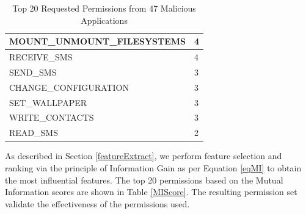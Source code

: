 \begin{table}[]
\begin{tabular}{|l|l|}
MOUNT\_UNMOUNT\_FILESYSTEMS       & 4                  \\ \hline
RECEIVE\_SMS                      & 4                  \\ \hline
SEND\_SMS                         & 3                  \\ \hline
CHANGE\_CONFIGURATION             & 3                  \\ \hline
SET\_WALLPAPER                    & 3                  \\ \hline
WRITE\_CONTACTS                   & 3                  \\ \hline
READ\_SMS                         & 2                  \\ \hline
\end{tabular}
\caption{Top 20 Requested Permissions from 47 Malicious Applications}\label{maliciousPerm}
\end{table}
\normalsize
As described in Section \ref{featureExtract}, we perform feature selection and ranking via the principle of Information Gain as per Equation \ref{eqMI} to obtain the most influential features. The top 20 permissions based on the Mutual Information scores are shown in Table \ref{MIScore}. The resulting permission set validate the effectiveness of the permissions used. 
\small

